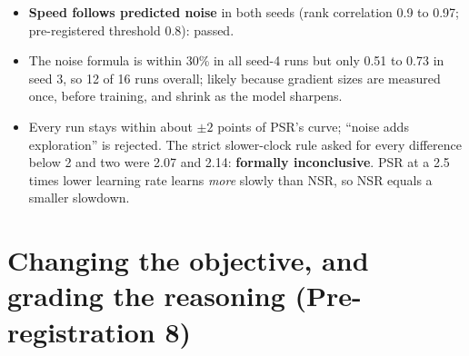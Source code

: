 \documentclass[11pt]{article}
\begin{document}
\begin{table}[H]
\centering\small
{}
\end{table}

\begin{found}
\begin{itemize}[leftmargin=*,itemsep=1pt]
\item \textbf{Speed follows predicted noise} in both seeds (rank correlation 0.9 to 0.97; pre-registered threshold 0.8): passed.
\item The noise formula is within 30\% in all seed-4 runs but only 0.51 to 0.73 in seed 3, so 12 of 16 runs overall; likely because gradient sizes are measured once, before training, and shrink as the model sharpens.
\item Every run stays within about $\pm2$ points of PSR's curve; ``noise adds exploration'' is rejected. The strict slower-clock rule asked for every difference below 2 and two were 2.07 and 2.14: \textbf{formally inconclusive}. PSR at a 2.5 times lower learning rate learns \emph{more} slowly than NSR, so NSR equals a smaller slowdown.
\end{itemize}
\end{found}

\section{Changing the objective, and grading the reasoning (Pre-registration 8)}\label{sec:p8}
\end{document}
